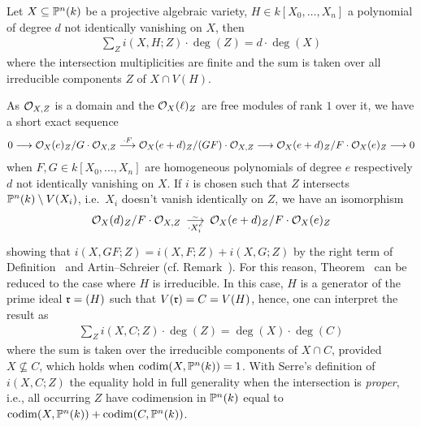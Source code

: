 \documentclass[a4paper,parskip=half,numbers=enddot, DIV=12, headheight=30pt]{scrreprt}
\begin{document}
\begin{thm} 
    Let $X\subseteq \mathbb{P}^n(k)$ be a projective algebraic variety, $H\in k[X_0,\ldots, X_n]$ a polynomial of degree $d$ not identically vanishing on $X$, then 
    \begin{align*}
        \sum_{Z} i(X,H;Z) \cdot \deg(Z) = d\cdot\deg (X)
    \end{align*}
    where the intersection multiplicities are finite and the sum is taken over all irreducible components $Z$ of $X\cap V(H)$.
\end{thm}
\begin{rem*}
    As $\mathcal{O}_{X,Z}$ is a domain and the $\mathcal{O}_X(\ell)_Z$ are free modules of rank $1$ over it, we have a short exact sequence
    \begin{align*}
        0\morphism \Oo_X(e)_Z/G\cdot \Oo_{X,Z} \morphism[\cdot F] \Oo_X(e+d)_Z/(GF)\cdot \Oo_{X,Z} \morphism \Oo_X(e+d)_Z/F\cdot \Oo_X(e)_Z \morphism 0
    \end{align*}
    when $F,G\in k[X_0,\ldots,X_n]$ are homogeneous polynomials of degree $e$ respectively $d$ not identically vanishing on $X$. If $i$ is chosen such that $Z$ intersects $\mathbb{P}^n(k)\setminus V(X_i)$, i.e.\ $X_i$ doesn't vanish identically on $Z$, we have an isomorphism
    \begin{align*}
        \Oo_X(d)_Z/ F\cdot \Oo_{X,Z} \isomorphism[\cdot X_i^e] \Oo_X(e+d)_Z/F\cdot \Oo_X(e)_Z
    \end{align*}
    showing that $i(X, GF; Z) = i(X,F;Z)+i(X,G;Z)$ by the right term of Definition~ and Artin--Schreier (cf. Remark~). For this reason, Theorem~ can be reduced to the case where $H$ is irreducible. In this case, $H$ is a generator of the prime ideal $\mathfrak{r}=(H)$ such that $V(\mathfrak{r}) = C = V(H)$, hence, one can interpret the result as
    \begin{align*}
        \sum_Z i(X,C;Z) \cdot \deg (Z) = \deg(X)\cdot \deg(C)
    \end{align*}
    where the sum is taken over the irreducible components of $X\cap C$, provided $X\not \subseteq C$, which holds when $\operatorname{codim}(X,\mathbb{P}^n(k)) = 1$. With Serre's definition of $i(X,C;Z)$ the equality hold in full generality when the intersection is \emph{proper}, i.e., all occurring $Z$ have codimension in $\mathbb{P}^n(k)$ equal to $\operatorname{codim} (X,\mathbb{P}^n(k)) +\operatorname{codim}(C, \mathbb{P}^n(k))$.
    

\end{rem*}
\end{document}
